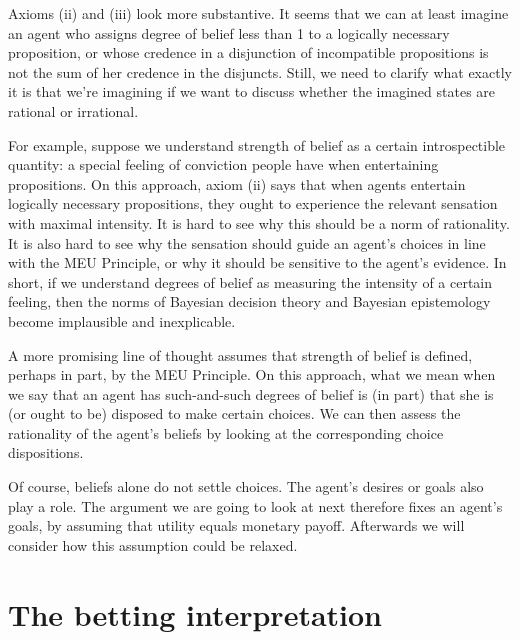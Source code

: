 Axioms (ii) and (iii) look more substantive. It seems that we can at least
imagine an agent who assigns degree of belief less than 1 to a logically
necessary proposition, or whose credence in a disjunction of incompatible
propositions is not the sum of her credence in the disjuncts. Still,
we need to clarify what exactly it is that we're imagining if we want to discuss
whether the imagined states are rational or irrational.

For example, suppose we understand strength of belief as a certain
introspectible quantity: a special feeling of conviction people have when
entertaining propositions. On this approach, axiom (ii) says that when agents
entertain logically necessary propositions, they ought to experience the
relevant sensation with maximal intensity. It is hard to see why this should be
a norm of rationality. It is also hard to see why the sensation should guide an
agent's choices in line with the MEU Principle, or why it should be sensitive to
the agent's evidence. In short, if we understand degrees of belief as measuring
the intensity of a certain feeling, then the norms of Bayesian decision theory
and Bayesian epistemology become implausible and inexplicable.


A more promising line of thought assumes that strength of belief is defined,
perhaps in part, by the MEU Principle. On this approach, what we mean when we
say that an agent has such-and-such degrees of belief is (in part) that she is
(or ought to be) disposed to make certain choices. We can then assess the
rationality of the agent's beliefs by looking at the corresponding choice
dispositions.

Of course, beliefs alone do not settle choices. The agent's desires or goals
also play a role. The argument we are going to look at next therefore fixes an
agent's goals, by assuming that utility equals monetary payoff. Afterwards we
will consider how this assumption could be relaxed.


\section{The betting interpretation}


